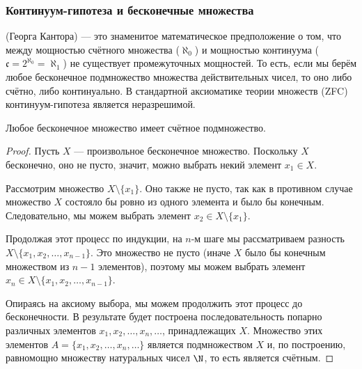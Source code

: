 \subsubsection{Континуум-гипотеза и бесконечные множества}

\noindent {} (Георга Кантора) --- это знаменитое математическое предположение о том, что между мощностью счётного множества (\(\aleph_0\)) и мощностью континуума (\(\mathfrak{c} = 2^{\aleph_0} = \aleph_1\)) не существует промежуточных мощностей. То есть, если мы берём любое бесконечное подмножество множества действительных чисел, то оно либо счётно, либо континуально. В стандартной аксиоматике теории множеств (ZFC) континуум-гипотеза является неразрешимой.

\begin{theorem}
    Любое бесконечное множество имеет счётное подмножество.
\end{theorem}

\begin{proof}
    Пусть $X$ --- произвольное бесконечное множество. Поскольку $X$ бесконечно, оно не пусто, значит, можно выбрать некий элемент $x_1 \in X$.
    
    Рассмотрим множество $X \setminus \{x_1\}$. Оно также не пусто, так как в противном случае множество $X$ состояло бы ровно из одного элемента и было бы конечным. Следовательно, мы можем выбрать элемент $x_2 \in X \setminus \{x_1\}$.
    
    Продолжая этот процесс по индукции, на $n$-м шаге мы рассматриваем разность $X \setminus \{x_1, x_2, \dots, x_{n-1}\}$. Это множество не пусто (иначе $X$ было бы конечным множеством из $n-1$ элементов), поэтому мы можем выбрать элемент $x_n \in X \setminus \{x_1, x_2, \dots, x_{n-1}\}$.
    
    Опираясь на аксиому выбора, мы можем продолжить этот процесс до бесконечности. В результате будет построена последовательность попарно различных элементов $x_1, x_2, \dots, x_n, \dots$, принадлежащих $X$. Множество этих элементов $A = \{x_1, x_2, \dots, x_n, \dots\}$ является подмножеством $X$ и, по построению, равномощно множеству натуральных чисел $\N$, то есть является счётным.
\end{proof}
